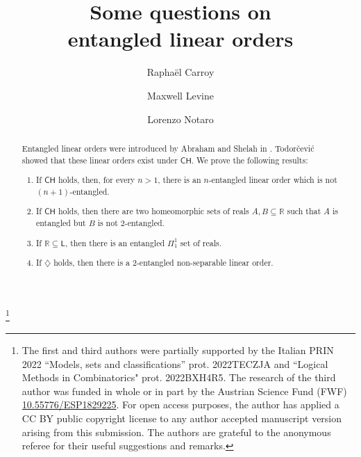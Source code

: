 \documentclass[12pt]{amsart}
\theoremstyle{definition}
\theoremstyle{remark}
\begin{document}
\title[Some questions on entangled linear orders]{Some questions on\\entangled linear orders}

\author[Carroy]{Rapha\"{e}l Carroy}
\address{Università degli Studi di Torino, Dipartimento di Matematica ``G. Peano", Via Carlo Alberto 10, 10123 Torino, Italy}
\curraddr{}
\author[Levine]{Maxwell Levine}
\address{Albert-Ludwigs-Universit{\"{a}}t Freiburg, Mathematisches Institut, Abteilung f\"{u}r math. Logik, Ernst–Zermelo–Stra{\ss}e 1, 79104 Freiburg im Breisgau, Germany}
\author[Notaro]{Lorenzo Notaro}
\address{University of Vienna, Institute of Mathematics, Kurt G\"{o}del Research Center, Kolingasse 14-16, 1090 Vienna, Austria}

\thanks{The first and third authors were partially supported by the Italian PRIN 2022 ``Models, sets and classifications” prot. 2022TECZJA and ``Logical Methods in Combinatorics" prot. 2022BXH4R5.
The research of the third author was funded in whole or in part by the Austrian Science Fund (FWF) \href{https://www.fwf.ac.at/en/research-radar/10.55776/ESP1829225}{10.55776/ESP1829225}. For open access purposes, the author has applied a CC BY public copyright license to any author accepted manuscript version arising from this submission.
The authors are grateful to the anonymous referee for their useful suggestions and remarks.}


\begin{abstract}
Entangled linear orders were introduced by Abraham and Shelah in \cite{avraham1981martin}. Todor{\v c}evi{\'c} \cite{MR799818} showed that these linear orders exist under $\mathsf{CH}$. We prove the following results: \vspace{0.4em}
\begin{enumerate}
\itemsep0.3em
\item If $\mathsf{CH}$ holds, then, for every $n > 1$, there is an $n$-entangled linear order which is not $(n+1)$-entangled.
\item If $\mathsf{CH}$ holds, then there are two homeomorphic sets of reals $A,B \subseteq \mathbb{R}$ such that $A$ is entangled but $B$ is not $2$-entangled.
\item If $\mathbb{R} \subseteq \mathsf{L}$, then there is an entangled $\Pi_1^1$ set of reals.
\item If $\diamondsuit$ holds, then there is a $2$-entangled non-separable linear order.
\end{enumerate}


\end{abstract}
\end{document}
